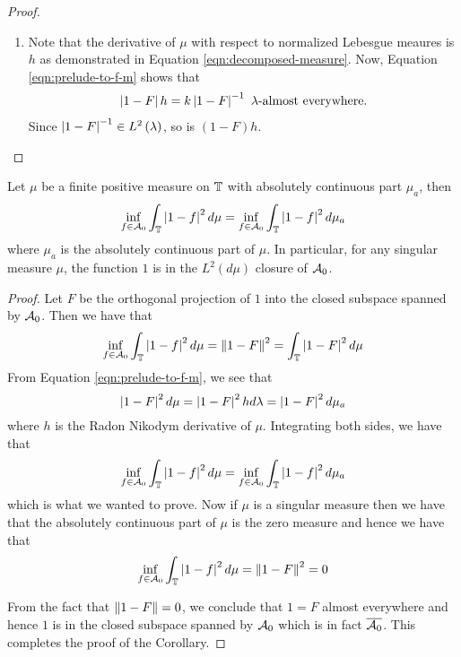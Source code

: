 \begin{proof}
\begin{enumerate}
\item Note that the derivative of $\mu$ with respect to normalized Lebesgue meaures is $h$ as demonstrated in Equation \ref{eqn:decomposed-measure}. Now, Equation \ref{eqn:prelude-to-f-m} shows that 
    \begin{align*}
	\left\lvert 1-F \right\rvert h = k\left\lvert 1-F \right\rvert^{-1} \text{ $\lambda$-almost everywhere.}
    \end{align*}
    Since $\left\lvert  1-F \right\rvert^{-1} \in L^{2} \left( \lambda \right)$, so is $(1-F)h$.
    \end{enumerate}
\end{proof}




\begin{corollary}
    Let $\mu$ be a finite positive measure on $\mathbb T$ with absolutely continuous part $\mu_{a}$, then
    \begin{align*}
	\inf_{f\in {\cal A}_{0}} \int_{\mathbb T} \left\lvert 1-f \right\rvert^{2} d\mu = \inf_{f\in {\cal A}_{0}} \int_{\mathbb T} \left\lvert 1-f \right\rvert^{2}  d\mu_{a}
    \end{align*}
    where $\mu_{a}$ is the absolutely continuous part of $\mu$.
    In particular, for any singular measure $\mu$, the function $1$ is in the $L^{2} \left( d\mu \right)$ closure of ${\cal A}_{0}$.
\end{corollary}
\begin{proof}
    Let $F$ be the orthogonal projection of $1$ into the closed subspace spanned by ${\cal A}_{0}$. Then we have that 
    \begin{align*}
	\inf_{f\in {\cal A}_{0}} \int_{\mathbb T} \left\lvert 1-f \right\rvert^{2} d\mu = \left\lVert 1-F \right\rVert^{2} = \int_{\mathbb T} \left\lvert 1-F \right\rvert^2 d\mu
    \end{align*}
    From Equation \ref{eqn:prelude-to-f-m}, we see that
    \begin{equation*}
	\left\lvert 1-F \right\rvert^{2} d\mu = \left\lvert 1-F \right\rvert^{2} h d\lambda = \left\lvert 1-F \right\rvert^{2} d\mu_{a}
    \end{equation*}
    where $h$ is the Radon Nikodym derivative of $\mu$.
    Integrating both sides, we have that
\begin{align*}
	\inf_{f\in {\cal A}_{0}} \int_{\mathbb T} \left\lvert 1-f \right\rvert^{2} d\mu = \inf_{f\in {\cal A}_{0}} \int_{\mathbb T} \left\lvert 1-f \right\rvert^{2}  d\mu_{a}
    \end{align*}
    which is what we wanted to prove.
    Now if $\mu$ is a singular measure then we have that the absolutely continuous part of $\mu$ is the zero measure and hence we have that
\begin{align*}
	\inf_{f\in {\cal A}_{0}} \int_{\mathbb T} \left\lvert 1-f \right\rvert^{2} d\mu = \left\lVert 1-F \right\rVert^{2} = 0   
    \end{align*}

    From the fact that $\left\lVert 1-F \right\rVert=0$, we conclude that $1=F$ almost everywhere and hence $1$ is in the closed subspace spanned by ${\cal A}_{0}$ which is in fact $\overline {{\cal A}_{0}}$. This completes the proof of the Corollary.
\end{proof}

